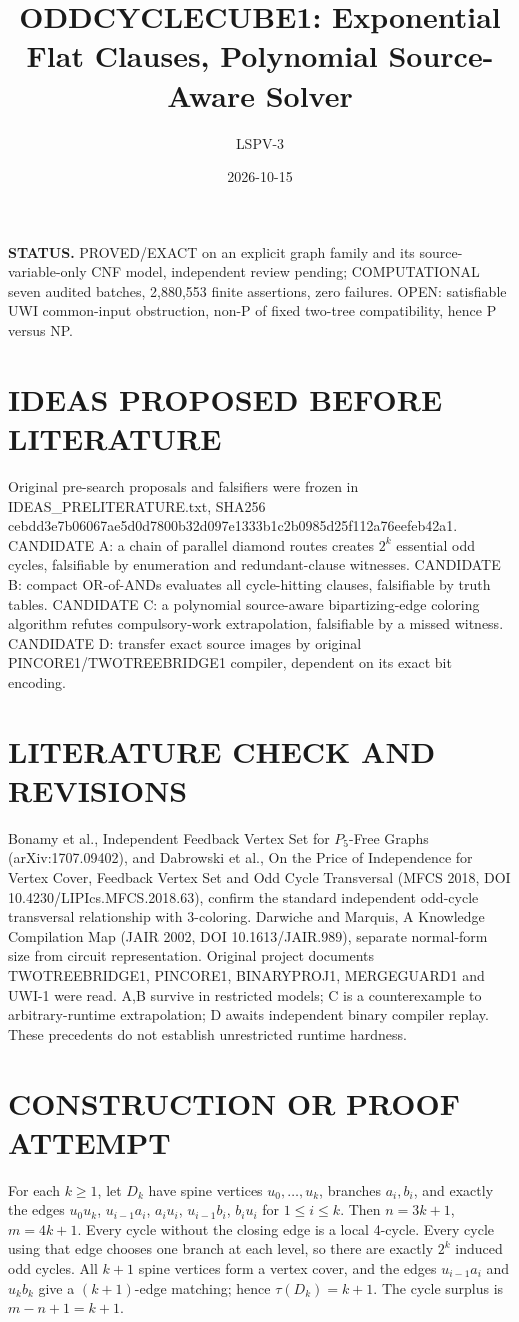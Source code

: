 \documentclass{article}
\title{ODDCYCLECUBE1: Exponential Flat Clauses, Polynomial Source-Aware Solver}
\author{LSPV-3}
\date{2026-10-15}
\begin{document}
\maketitle
\noindent\textbf{STATUS.} PROVED/EXACT on an explicit graph family and its source-variable-only CNF model, independent review pending; COMPUTATIONAL seven audited batches, 2,880,553 finite assertions, zero failures. OPEN: satisfiable UWI common-input obstruction, non-P of fixed two-tree compatibility, hence P versus NP.

\section{IDEAS PROPOSED BEFORE LITERATURE}
Original pre-search proposals and falsifiers were frozen in IDEAS\_PRELITERATURE.txt, SHA256 cebdd3e7b06067ae5d0d7800b32d097e1333b1c2b0985d25f112a76eefeb42a1.
CANDIDATE A: a chain of parallel diamond routes creates $2^k$ essential odd cycles, falsifiable by enumeration and redundant-clause witnesses.
CANDIDATE B: compact OR-of-ANDs evaluates all cycle-hitting clauses, falsifiable by truth tables.
CANDIDATE C: a polynomial source-aware bipartizing-edge coloring algorithm refutes compulsory-work extrapolation, falsifiable by a missed witness.
CANDIDATE D: transfer exact source images by original PINCORE1/TWOTREEBRIDGE1 compiler, dependent on its exact bit encoding.

\section{LITERATURE CHECK AND REVISIONS}
Bonamy et al., Independent Feedback Vertex Set for $P_5$-Free Graphs (arXiv:1707.09402), and Dabrowski et al., On the Price of Independence for Vertex Cover, Feedback Vertex Set and Odd Cycle Transversal (MFCS 2018, DOI 10.4230/LIPIcs.MFCS.2018.63), confirm the standard independent odd-cycle transversal relationship with 3-coloring. Darwiche and Marquis, A Knowledge Compilation Map (JAIR 2002, DOI 10.1613/JAIR.989), separate normal-form size from circuit representation. Original project documents TWOTREEBRIDGE1, PINCORE1, BINARYPROJ1, MERGEGUARD1 and UWI-1 were read. A,B survive in restricted models; C is a counterexample to arbitrary-runtime extrapolation; D awaits independent binary compiler replay. These precedents do not establish unrestricted runtime hardness.

\section{CONSTRUCTION OR PROOF ATTEMPT}
For each $k\ge1$, let $D_k$ have spine vertices $u_0,\ldots,u_k$, branches $a_i,b_i$, and exactly the edges $u_0u_k$, $u_{i-1}a_i$, $a_iu_i$, $u_{i-1}b_i$, $b_iu_i$ for $1\le i\le k$. Then $n=3k+1$, $m=4k+1$. Every cycle without the closing edge is a local 4-cycle. Every cycle using that edge chooses one branch at each level, so there are exactly $2^k$ induced odd cycles. All $k+1$ spine vertices form a vertex cover, and the edges $u_{i-1}a_i$ and $u_kb_k$ give a $(k+1)$-edge matching; hence $\tau(D_k)=k+1$. The cycle surplus is $m-n+1=k+1$.
\end{document}
